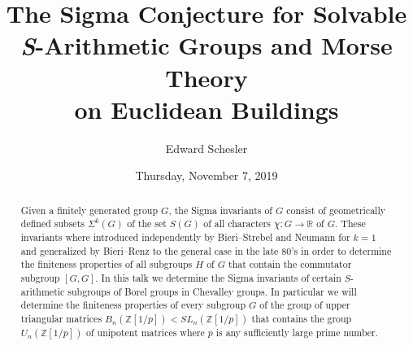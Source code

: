 \documentclass{UAmathtalk}
\author{Edward Schesler}
\title{The Sigma Conjecture for Solvable \emph{S}-Arithmetic Groups and Morse Theory\\on Euclidean Buildings}
\date{Thursday, November 7, 2019}
\begin{document}
\maketitle

\begin{abstract}
Given a finitely generated group $G$, the Sigma invariants of $G$ consist of geometrically defined subsets $\Sigma^k(G)$ of the set $S(G)$ of all characters $\chi\colon G \to \mathbb{R}$ of $G$. These invariants where introduced independently by Bieri--Strebel and Neumann for $k=1$ and generalized by Bieri--Renz to the general case in the late 80's in order to determine the finiteness properties of all subgroups $H$ of $G$ that contain the commutator subgroup $[G,G]$. In this talk we determine the Sigma invariants of certain $S$-arithmetic subgroups of Borel groups in Chevalley groups. In particular we will determine the finiteness properties of every subgroup $G$ of the group of upper triangular matrices $B_n(\mathbb{Z}[1/p]) < SL_n(\mathbb{Z}[1/p])$ that contains the group $U_n(\mathbb{Z}[1/p])$ of unipotent matrices where $p$ is any sufficiently large prime number.
\end{abstract}
\end{document}
